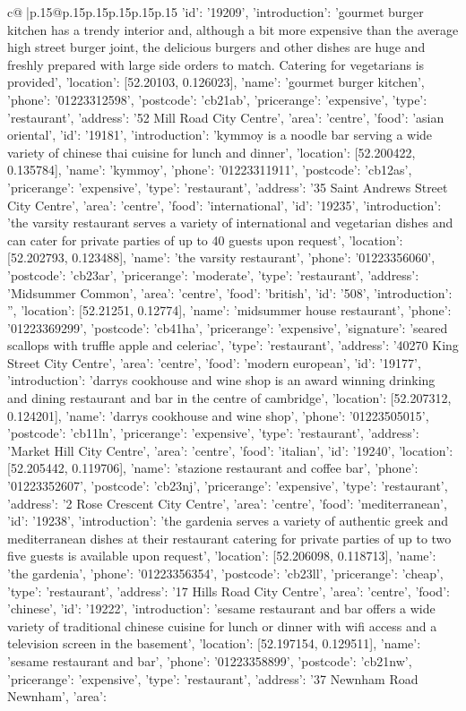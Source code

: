 \documentclass{article}
\begin{document}
{\begin{supertabular}{c@{$\;$}|p{.15\linewidth}@{}p{.15\linewidth}p{.15\linewidth}p{.15\linewidth}p{.15\linewidth}p{.15\linewidth}}
{{{'id': '19209', 'introduction': 'gourmet burger kitchen has a trendy interior and, although a bit more expensive than the average high street burger joint, the delicious burgers and other dishes are huge and freshly prepared with large side orders to match. Catering for vegetarians is provided', 'location': [52.20103, 0.126023], 'name': 'gourmet burger kitchen', 'phone': '01223312598', 'postcode': 'cb21ab', 'pricerange': 'expensive', 'type': 'restaurant'}, {'address': '52 Mill Road City Centre', 'area': 'centre', 'food': 'asian oriental', 'id': '19181', 'introduction': 'kymmoy is a noodle bar serving a wide variety of chinese thai cuisine for lunch and dinner', 'location': [52.200422, 0.135784], 'name': 'kymmoy', 'phone': '01223311911', 'postcode': 'cb12as', 'pricerange': 'expensive', 'type': 'restaurant'}, {'address': '35 Saint Andrews Street City Centre', 'area': 'centre', 'food': 'international', 'id': '19235', 'introduction': 'the varsity restaurant serves a variety of international and vegetarian dishes and can cater for private parties of up to 40 guests upon request', 'location': [52.202793, 0.123488], 'name': 'the varsity restaurant', 'phone': '01223356060', 'postcode': 'cb23ar', 'pricerange': 'moderate', 'type': 'restaurant'}, {'address': 'Midsummer Common', 'area': 'centre', 'food': 'british', 'id': '508', 'introduction': '', 'location': [52.21251, 0.12774], 'name': 'midsummer house restaurant', 'phone': '01223369299', 'postcode': 'cb41ha', 'pricerange': 'expensive', 'signature': 'seared scallops with truffle apple and celeriac', 'type': 'restaurant'}, {'address': '40270 King Street City Centre', 'area': 'centre', 'food': 'modern european', 'id': '19177', 'introduction': 'darrys cookhouse and wine shop is an award winning drinking and dining restaurant and bar in the centre of cambridge', 'location': [52.207312, 0.124201], 'name': 'darrys cookhouse and wine shop', 'phone': '01223505015', 'postcode': 'cb11ln', 'pricerange': 'expensive', 'type': 'restaurant'}, {'address': 'Market Hill City Centre', 'area': 'centre', 'food': 'italian', 'id': '19240', 'location': [52.205442, 0.119706], 'name': 'stazione restaurant and coffee bar', 'phone': '01223352607', 'postcode': 'cb23nj', 'pricerange': 'expensive', 'type': 'restaurant'}, {'address': '2 Rose Crescent City Centre', 'area': 'centre', 'food': 'mediterranean', 'id': '19238', 'introduction': 'the gardenia serves a variety of authentic greek and mediterranean dishes at their restaurant catering for private parties of up to two five guests is available upon request', 'location': [52.206098, 0.118713], 'name': 'the gardenia', 'phone': '01223356354', 'postcode': 'cb23ll', 'pricerange': 'cheap', 'type': 'restaurant'}, {'address': '17 Hills Road City Centre', 'area': 'centre', 'food': 'chinese', 'id': '19222', 'introduction': 'sesame restaurant and bar offers a wide variety of traditional chinese cuisine for lunch or dinner with wifi access and a television screen in the basement', 'location': [52.197154, 0.129511], 'name': 'sesame restaurant and bar', 'phone': '01223358899', 'postcode': 'cb21nw', 'pricerange': 'expensive', 'type': 'restaurant'}, {'address': '37 Newnham Road Newnham', 'area': }}}
\end{supertabular}}
\end{document}
